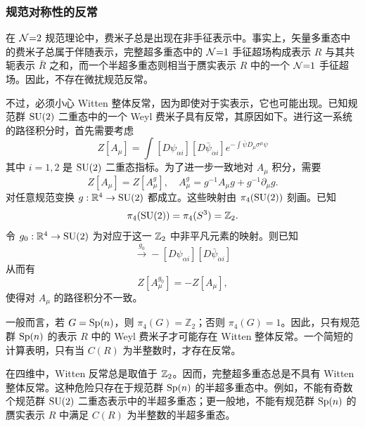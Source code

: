 \subsubsection{规范对称性的反常}
在 $\mathcal{N}{=}2$ 规范理论中，费米子总是出现在非手征表示中。事实上，矢量多重态中的费米子总属于伴随表示，完整超多重态中的 $\mathcal{N}{=}1$ 手征超场构成表示 $R$ 与其共轭表示 $\bar R$ 之和，而一个半超多重态则相当于赝实表示 $R$ 中的一个 $\mathcal{N}{=}1$ 手征超场。因此，不存在微扰规范反常。

不过，必须小心 Witten 整体反常\cite{Witten:1982fp}，因为即使对于实表示，它也可能出现。已知规范群 $\mathop{\mathrm{SU}}(2)$ 二重态中的一个 Weyl 费米子具有反常，其原因如下。进行这一系统的路径积分时，首先需要考虑
\begin{equation}
Z[A_\mu] = \int [D\psi_{\alpha i}][D\bar\psi_{\dot\alpha i}] e^{-\int \bar\psi D_\mu \sigma^\mu \psi}
\end{equation}
其中 $i=1,2$ 是 $\mathop{\mathrm{SU}}(2)$ 二重态指标。为了进一步一致地对 $A_\mu$ 积分，需要
\begin{equation}
Z[A_\mu]= Z[A^g_\mu], \quad A^g_\mu = g^{-1} A_\mu g  + g^{-1} \partial_\mu g.
\end{equation}
对任意规范变换 $g:\mathbb{R}^4\to\mathop{\mathrm{SU}}(2)$ 都成立。这些映射由 $\pi_4(\mathop{\mathrm{SU}}(2))$ 刻画。已知
\begin{equation}
\pi_4(\mathop{\mathrm{SU}}(2))=\pi_4(S^3)=\mathbb{Z}_2.
\end{equation}
令 $g_0:\mathbb{R}^4\to\mathop{\mathrm{SU}}(2)$ 为对应于这一 $\mathbb{Z}_2$ 中非平凡元素的映射。则已知
\begin{equation}
[D\psi_{\alpha i}][D\bar\psi_{\dot\alpha i}] \stackrel{g_0}{\longrightarrow}
-[D\psi_{\alpha i}][D\bar\psi_{\dot\alpha i}]
\end{equation}
从而有
\begin{equation}
Z[A^{g_0}_\mu] = -Z[A_\mu],
\end{equation}
使得对 $A_\mu$ 的路径积分不一致。

一般而言，若 $G=\mathop{\mathrm{Sp}}(n)$，则 $\pi_4(G)=\mathbb{Z}_2$；否则 $\pi_4(G)=1$。因此，只有规范群 $\mathop{\mathrm{Sp}}(n)$ 的表示 $R$ 中的 Weyl 费米子才可能存在 Witten 整体反常。一个简短的计算表明，只有当 $C(R)$ 为半整数时，才存在反常。

在四维中，Witten 反常总是取值于 $\mathbb{Z}_2$。因而，完整超多重态总是不具有 Witten 整体反常。这种危险只存在于规范群 $\mathop{\mathrm{Sp}}(n)$ 的半超多重态中。例如，不能有奇数个规范群 $\mathop{\mathrm{SU}}(2)$ 二重态表示中的半超多重态；更一般地，不能有规范群 $\mathop{\mathrm{Sp}}(n)$ 的赝实表示 $R$ 中满足 $C(R)$ 为半整数的半超多重态。

